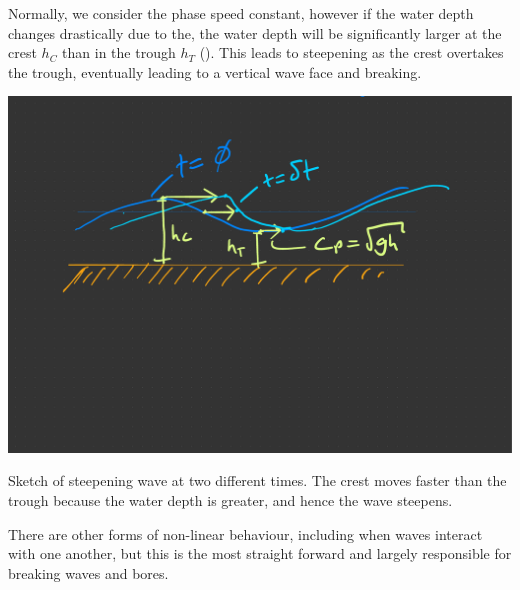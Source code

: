 Normally, we consider the phase speed constant, however if the water depth changes drastically due to the, the water depth will be significantly larger at the crest $h_C$ than in the trough $h_T$ ().  This leads to steepening as the crest overtakes the trough, eventually leading to a vertical wave face and breaking.  

\begin{marginfigure}
    \includegraphics{figs/Waves/SketchNonLinearWave}
    \caption{Sketch of steepening wave at two different times.  The crest moves faster than the trough because the water depth is greater, and hence the wave steepens.}
    \label{fig:SketchNonLinearWave} 
\end{marginfigure}

There are other forms of non-linear behaviour, including when waves interact with one another, but this is the most straight forward and largely responsible for breaking waves and bores.  

